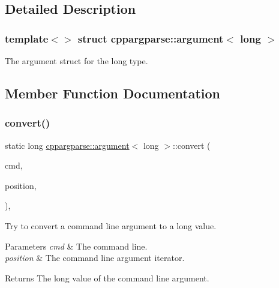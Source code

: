 \subsection{Detailed Description}
\subsubsection*{template$<$$>$\newline
struct cppargparse\+::argument$<$ long $>$}

The argument struct for the long type. 

\subsection{Member Function Documentation}
\mbox{\label{structcppargparse_1_1argument_3_01long_01_4_a8fe695168f4152ec996e929fb76330c1}} 
\subsubsection{\texorpdfstring{convert()}{convert()}}
{\footnotesize\ttfamily static long \hyperlink{structcppargparse_1_1argument}{cppargparse\+::argument}$<$ long $>$\+::convert (\begin{DoxyParamCaption}\item[{const \hyperlink{types_8h_a80adf2418b7ce9fe616698efa7533ecf}{types\+::\+Command\+Line\+\_\+t} \&}]{cmd,  }\item[{const \hyperlink{types_8h_a43b4f43f8940de1bf09ced6f1b668053}{types\+::\+Command\+Line\+Position\+\_\+t} \&}]{position,  }\item[{const \hyperlink{types_8h_a003c660afe2ee9c6cc39aea966e8926d}{types\+::\+Command\+Line\+Arguments\+\_\+t} \&}]{ }\end{DoxyParamCaption})\hspace{0.3cm}{\ttfamily [inline]}, {\ttfamily [static]}}



Try to convert a command line argument to a long value. 


\begin{DoxyParams}{Parameters}
{\em cmd} & The command line. \\
\hline
{\em position} & The command line argument iterator.\\
\hline
\end{DoxyParams}
\begin{DoxyReturn}{Returns}
The long value of the command line argument. 
\end{DoxyReturn}
\mbox{\label{structcppargparse_1_1argument_3_01long_01_4_a505f7e1215f1b2939f05dfb451b7a90a}} 
